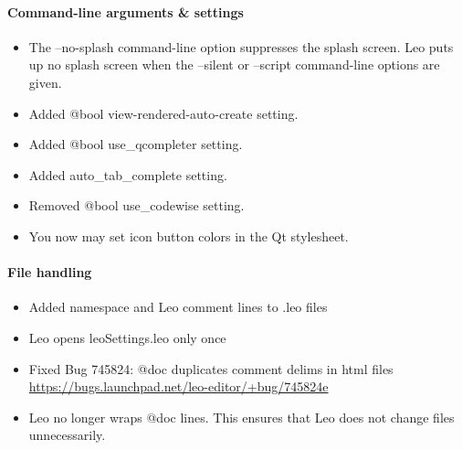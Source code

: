\documentclass[a4paper,10pt,english]{sphinxmanual}
\begin{document}
\paragraph{Command-line arguments \& settings}
\label{what-is-new:command-line-arguments-settings}\begin{itemize}
\item {} 
The --no-splash command-line option suppresses the splash screen.
Leo puts up no splash screen when the --silent
or --script command-line options are given.

\item {} 
Added @bool view-rendered-auto-create setting.

\item {} 
Added @bool use\_qcompleter setting.

\item {} 
Added auto\_tab\_complete setting.

\item {} 
Removed @bool use\_codewise setting.

\item {} 
You now may set icon button colors in the Qt stylesheet.

\end{itemize}


\paragraph{File handling}
\label{what-is-new:file-handling}\begin{itemize}
\item {} 
Added namespace and Leo comment lines to .leo files

\item {} 
Leo opens leoSettings.leo only once

\item {} 
Fixed Bug 745824: @doc duplicates comment delims in html files
\href{https://bugs.launchpad.net/leo-editor/+bug/745824e}{https://bugs.launchpad.net/leo-editor/+bug/745824e}

\item {} 
Leo no longer wraps @doc lines. This ensures that Leo does not change files
unnecessarily.

\end{itemize}
\end{document}
